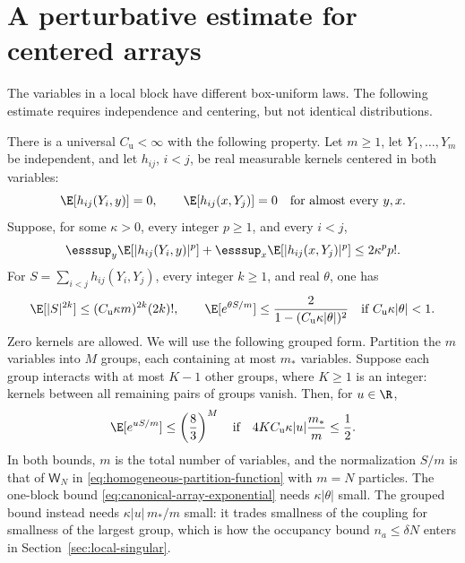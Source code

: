 \section{A perturbative estimate for centered arrays}
\label{sec:canonical-arrays}
The variables in a local block have different box-uniform laws.  The following estimate requires independence and centering, but not identical distributions.

\begin{lemma}
\label{lem:canonical-array-exponential}
There is a universal $C_{\mathrm u}<\infty$ with the following property.  Let $m\ge1$, let $Y_1,\ldots,Y_m$ be independent, and let $h_{ij}$, $i<j$, be real measurable kernels centered in both variables:
\begin{equation}
 \E[h_{ij}(Y_i,y)]=0,\qquad \E[h_{ij}(x,Y_j)]=0
 \quad\text{for almost every }y,x.
 \label{eq:canonical-array-centering}
\end{equation}
Suppose, for some $\kappa>0$, every integer $p\ge1$, and every $i<j$,
\begin{equation}
 \esssup_y\E[|h_{ij}(Y_i,y)|^p]
 +\esssup_x\E[|h_{ij}(x,Y_j)|^p]\le2\kappa^p p!.
 \label{eq:canonical-array-kernel-moments}
\end{equation}
For $S=\sum_{i<j}h_{ij}(Y_i,Y_j)$, every integer $k\ge1$, and real $\theta$, one has
\begin{equation}
 \E[|S|^{2k}]\le(C_{\mathrm u}\kappa m)^{2k}(2k)!,
 \qquad
 \E[e^{\theta S/m}]
 \le\frac2{1-(C_{\mathrm u}\kappa|\theta|)^2}
 \quad\text{if }C_{\mathrm u}\kappa|\theta|<1.
 \label{eq:canonical-array-exponential}
\end{equation}
Zero kernels are allowed.  We will use the following grouped form.  Partition the $m$ variables into $M$ groups, each containing at most $m_*$ variables.  Suppose each group interacts with at most $K-1$ other groups, where $K\ge1$ is an integer: kernels between all remaining pairs of groups vanish.  Then, for $u\in\R$,
\begin{equation}
 \E[e^{uS/m}]\le\left(\frac83\right)^M
 \quad\text{if}\quad
 4K C_{\mathrm u}\kappa|u|\frac{m_*}{m}\le\frac12.
 \label{eq:canonical-grouped-exponential}
\end{equation}
In both bounds, $m$ is the total number of variables, and the normalization $S/m$ is that of $\mathsf W_N$ in \eqref{eq:homogeneous-partition-function} with $m=N$ particles.  The one-block bound \eqref{eq:canonical-array-exponential} needs $\kappa|\theta|$ small.  The grouped bound instead needs $\kappa|u|\,m_*/m$ small: it trades smallness of the coupling for smallness of the largest group, which is how the occupancy bound $n_a\le\delta N$ enters in Section~\ref{sec:local-singular}.
\end{lemma}

